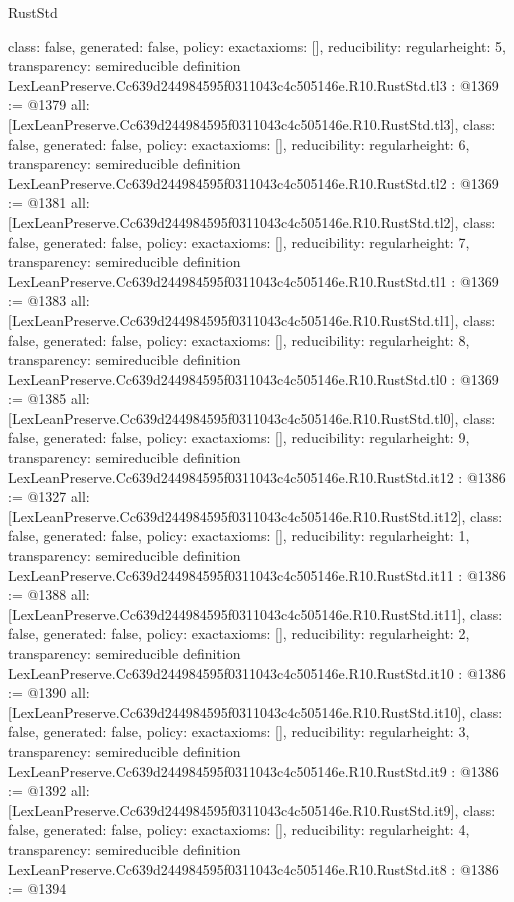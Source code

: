 \begin{lexlean}{RustStd}
\begin{coremodule}
{  class: false,
  generated: false,
  policy: exact{axioms: []},
  reducibility: regular{height: 5},
  transparency: semireducible
}
definition LexLeanPreserve.Cc639d244984595f0311043c4c505146e.R10.RustStd.tl3 : @1369 := @1379 {
  all: [LexLeanPreserve.Cc639d244984595f0311043c4c505146e.R10.RustStd.tl3],
  class: false,
  generated: false,
  policy: exact{axioms: []},
  reducibility: regular{height: 6},
  transparency: semireducible
}
definition LexLeanPreserve.Cc639d244984595f0311043c4c505146e.R10.RustStd.tl2 : @1369 := @1381 {
  all: [LexLeanPreserve.Cc639d244984595f0311043c4c505146e.R10.RustStd.tl2],
  class: false,
  generated: false,
  policy: exact{axioms: []},
  reducibility: regular{height: 7},
  transparency: semireducible
}
definition LexLeanPreserve.Cc639d244984595f0311043c4c505146e.R10.RustStd.tl1 : @1369 := @1383 {
  all: [LexLeanPreserve.Cc639d244984595f0311043c4c505146e.R10.RustStd.tl1],
  class: false,
  generated: false,
  policy: exact{axioms: []},
  reducibility: regular{height: 8},
  transparency: semireducible
}
definition LexLeanPreserve.Cc639d244984595f0311043c4c505146e.R10.RustStd.tl0 : @1369 := @1385 {
  all: [LexLeanPreserve.Cc639d244984595f0311043c4c505146e.R10.RustStd.tl0],
  class: false,
  generated: false,
  policy: exact{axioms: []},
  reducibility: regular{height: 9},
  transparency: semireducible
}
definition LexLeanPreserve.Cc639d244984595f0311043c4c505146e.R10.RustStd.it12 : @1386 := @1327 {
  all: [LexLeanPreserve.Cc639d244984595f0311043c4c505146e.R10.RustStd.it12],
  class: false,
  generated: false,
  policy: exact{axioms: []},
  reducibility: regular{height: 1},
  transparency: semireducible
}
definition LexLeanPreserve.Cc639d244984595f0311043c4c505146e.R10.RustStd.it11 : @1386 := @1388 {
  all: [LexLeanPreserve.Cc639d244984595f0311043c4c505146e.R10.RustStd.it11],
  class: false,
  generated: false,
  policy: exact{axioms: []},
  reducibility: regular{height: 2},
  transparency: semireducible
}
definition LexLeanPreserve.Cc639d244984595f0311043c4c505146e.R10.RustStd.it10 : @1386 := @1390 {
  all: [LexLeanPreserve.Cc639d244984595f0311043c4c505146e.R10.RustStd.it10],
  class: false,
  generated: false,
  policy: exact{axioms: []},
  reducibility: regular{height: 3},
  transparency: semireducible
}
definition LexLeanPreserve.Cc639d244984595f0311043c4c505146e.R10.RustStd.it9 : @1386 := @1392 {
  all: [LexLeanPreserve.Cc639d244984595f0311043c4c505146e.R10.RustStd.it9],
  class: false,
  generated: false,
  policy: exact{axioms: []},
  reducibility: regular{height: 4},
  transparency: semireducible
}
definition LexLeanPreserve.Cc639d244984595f0311043c4c505146e.R10.RustStd.it8 : @1386 := @1394 {
}
\end{coremodule}
\end{lexlean}

